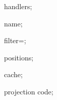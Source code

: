 %
%

%



{%

  \attribute handlers;%

  \attribute name;%

  \attribute filter=\pgfdvnamedvisualizerfilter;%

  \attribute positions;%

  \attribute cache;%

  \attribute projection code;%

}
